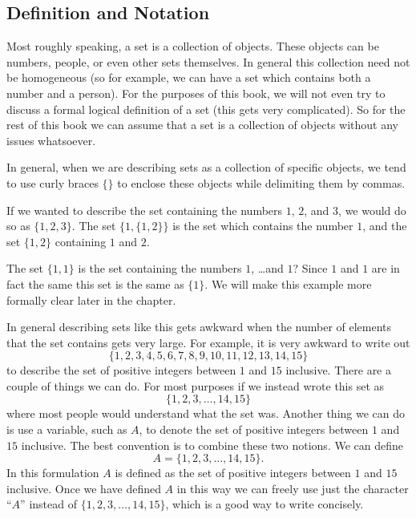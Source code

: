 \subsection{Definition and Notation}

Most roughly speaking, a set is a collection of objects. These objects can be numbers, people, or even other sets themselves. In general this collection need not be homogeneous (so for example, we can have a set which contains both a number and a person). For the purposes of this book, we will not even try to discuss a formal logical definition of a set (this gets very complicated). So for the rest of this book we can assume that a set is a collection of objects without any issues whatsoever.

In general, when we are describing sets as a collection of specific objects, we tend to use curly braces $\{\}$ to enclose these objects while delimiting them by commas.

\begin{example}
If we wanted to describe the set containing the numbers $1$, $2$, and $3$, we would do so as $\{1, 2, 3\}$. The set $\{1, \{1, 2\}\}$ is the set which contains the number $1$, and the set $\{1, 2\}$ containing $1$ and $2$.

The set $\{1, 1\}$ is the set containing the numbers $1$, \ldots and $1$? Since $1$ and $1$ are in fact the same this set is the same as $\{1\}$. We will make this example more formally clear later in the chapter.
\end{example}

In general describing sets like this gets awkward when the number of elements that the set contains gets very large. For example, it is very awkward to write out 
\[\{1, 2, 3, 4, 5, 6, 7, 8, 9, 10, 11, 12, 13, 14, 15\}\]
to describe the set of positive integers between $1$ and $15$ inclusive. There are a couple of things we can do. For most purposes if we instead wrote this set as
\[\{1, 2, 3, \dots, 14, 15\}\]
where most people would understand what the set was. Another thing we can do is use a variable, such as $A$, to denote the set of positive integers between $1$ and $15$ inclusive. The best convention is to combine these two notions. We can define
\[A = \{1, 2, 3, \dots, 14, 15\}.\]
In this formulation $A$ is defined as the set of positive integers between $1$ and $15$ inclusive. Once we have defined $A$ in this way we can freely use just the character ``$A$'' instead of $\{1, 2, 3, \dots, 14, 15\}$, which is a good way to write concisely.

